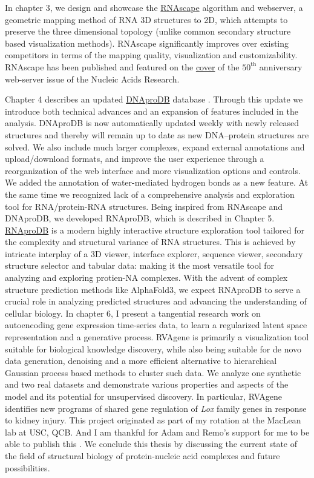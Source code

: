 In chapter 3, we design and showcase the  \href{https://rnascape.usc.edu/}{RNAscape} algorithm and webserver, a geometric mapping method of RNA 3D structures to 2D, which attempts to preserve the three dimensional topology (unlike common secondary structure based visualization methods). RNAscape significantly improves over existing competitors \citep{Yang2003} in terms of the mapping quality, visualization and customizability. RNAscape has been published \citep{Mitra2024rnascape} and featured on the \href{https://academic.oup.com/nar/issue/52/W1}{cover} of the $50^\text{th}$ anniversary web-server issue of the Nucleic Acids Research.

Chapter 4 describes an updated \href{https://dnaprodb.usc.edu}{DNAproDB} database \citep{Sagendorf2017, Sagendorf2020}. Through this update we introduce both technical advances and an expansion of features included in the analysis. DNAproDB is now automatically updated weekly with newly released structures and thereby will remain up to date as new DNA–protein structures are solved. We also include much larger
complexes, expand external annotations and upload/download formats, and improve the user
experience through a reorganization of the web interface and more visualization options and controls. We added the annotation of water-mediated hydrogen bonds as a new feature.
At the same time we recognized lack of a comprehensive analysis and exploration tool for RNA/protein-RNA structures. Being inspired from RNAscape and DNAproDB, we developed RNAproDB, which is described in Chapter 5. \href{https://rohslab.usc.edu/rnaprodb/}{RNAproDB} is a modern highly interactive structure exploration tool tailored for the complexity and structural variance of RNA structures. This is achieved by intricate interplay of a 3D viewer, interface explorer, sequence viewer, secondary structure selector and tabular data:  making it the most versatile tool for analyzing and exploring protien-NA complexes. With the advent of complex structure prediction methods like AlphaFold3, we expect RNAproDB to serve a crucial role in analyzing predicted structures and advancing the understanding of cellular biology.
In chapter 6, I present a tangential research work on autoencoding gene expression time-series data, to learn a regularized latent space representation and a generative process. RVAgene is primarily a visualization tool suitable for biological
knowledge discovery, while also being suitable for de novo data generation, denoising and a more
efficient alternative to hierarchical Gaussian process based methods \citep{mcdowell2018} to cluster such data. We
analyze one synthetic and two real datasets and demonstrate various properties and aspects of the
model and its potential for unsupervised discovery.  In particular, RVAgene identifies new programs of
shared gene regulation of \textit{Lox} family genes in response to kidney injury. This project originated as part of my rotation at the MacLean lab at USC, QCB. And I am thankful for Adam and Remo's support for me to be able to publish this \citep{Mitra2021}.
We conclude this thesis by discussing the current state of the field of structural biology of protein-nucleic acid complexes and future possibilities.
